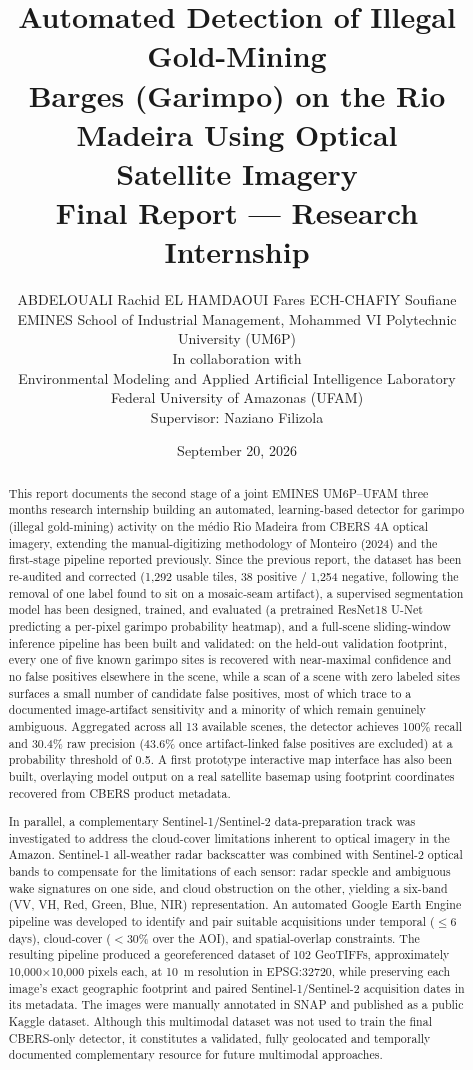 \documentclass[11pt,a4paper]{article}
\title{\textbf{Automated Detection of Illegal Gold-Mining\\
Barges (Garimpo) on the Rio Madeira Using Optical\\
Satellite Imagery}\\[0.3cm]
\large Final Report --- Research Internship}
\author{
ABDELOUALI Rachid \quad EL HAMDAOUI Fares \quad ECH-CHAFIY Soufiane\\[0.15cm]
\small EMINES School of Industrial Management, Mohammed VI Polytechnic University (UM6P)\\[0.3cm]
\normalsize In collaboration with\\
\small Environmental Modeling and Applied Artificial Intelligence Laboratory\\
\small Federal University of Amazonas (UFAM)\\[0.3cm]
\small Supervisor: Naziano Filizola
}
\date{September 20, 2026}
\begin{document}
\maketitle

\begin{abstract}

This report documents the second stage of a joint EMINES UM6P--UFAM three months research
internship building an automated, learning-based detector for garimpo (illegal
gold-mining) activity on the m\'edio Rio Madeira from CBERS 4A optical imagery,
extending the manual-digitizing methodology of Monteiro (2024) and the
first-stage pipeline reported previously. Since the previous report, the dataset
has been re-audited and corrected (1,292 usable tiles, 38 positive / 1,254
negative, following the removal of one label found to sit on a mosaic-seam
artifact), a supervised segmentation model has been designed, trained, and
evaluated (a pretrained ResNet18 U-Net predicting a per-pixel garimpo
probability heatmap), and a full-scene sliding-window inference pipeline has
been built and validated: on the held-out validation footprint, every one of
five known garimpo sites is recovered with near-maximal confidence and no false
positives elsewhere in the scene, while a scan of a scene with zero labeled
sites surfaces a small number of candidate false positives, most of which
trace to a documented image-artifact sensitivity and a minority of which remain
genuinely ambiguous. Aggregated across all 13 available scenes, the detector
achieves 100\% recall and 30.4\% raw precision (43.6\% once artifact-linked
false positives are excluded) at a probability threshold of 0.5. A first
prototype interactive map interface has also been built, overlaying model
output on a real satellite basemap using footprint coordinates recovered from
CBERS product metadata.

In parallel, a complementary Sentinel-1/Sentinel-2 data-preparation track was
investigated to address the cloud-cover limitations inherent to optical imagery
in the Amazon. Sentinel-1 all-weather radar backscatter was combined with
Sentinel-2 optical bands to compensate for the limitations of each sensor:
radar speckle and ambiguous wake signatures on one side, and cloud obstruction
on the other, yielding a six-band (VV, VH, Red, Green, Blue, NIR)
representation. An automated Google Earth Engine pipeline was developed to
identify and pair suitable acquisitions under temporal ($\leq 6$ days),
cloud-cover ($<30\%$ over the AOI), and spatial-overlap constraints. The
resulting pipeline produced a georeferenced dataset of 102 GeoTIFFs,
approximately 10,000$\times$10,000 pixels each, at 10~m resolution in
EPSG:32720, while preserving each image's exact geographic footprint and
paired Sentinel-1/Sentinel-2 acquisition dates in its metadata. The images
were
manually annotated in SNAP and published as a public Kaggle dataset. Although
this multimodal dataset was not used to train the final CBERS-only detector,
it constitutes a validated, fully geolocated and temporally documented
complementary resource for future multimodal approaches.


\end{abstract}
\end{document}
